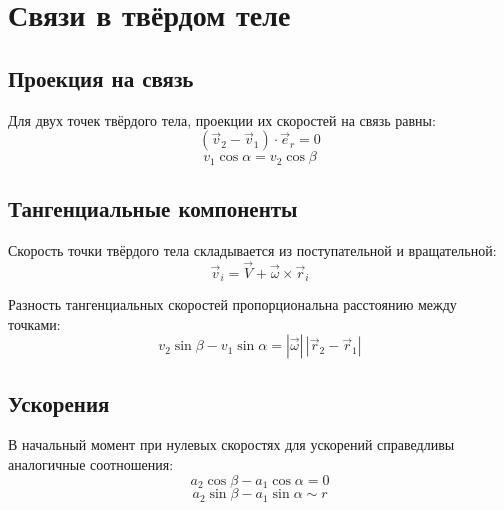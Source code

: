 \documentclass[12pt]{article}
\begin{document}
\section*{Связи в твёрдом теле}

\subsection*{Проекция на связь}
Для двух точек твёрдого тела, проекции их скоростей на связь равны:
\[(\vec v_2 - \vec v_1)\cdot\vec e_r = 0\]
\[v_1\cos\alpha = v_2\cos\beta\]

\subsection*{Тангенциальные компоненты}
Скорость точки твёрдого тела складывается из поступательной и вращательной:
\[\vec v_i = \vec V + \vec\omega \times \vec r_i\]

Разность тангенциальных скоростей пропорциональна расстоянию между точками:
\[v_2\sin\beta - v_1\sin\alpha = |\vec\omega|\,|\vec r_2 - \vec r_1|\]

\subsection*{Ускорения}
В начальный момент при нулевых скоростях для ускорений справедливы аналогичные соотношения:
\[a_2\cos\beta - a_1\cos\alpha = 0\]
\[a_2\sin\beta - a_1\sin\alpha \sim r\]
\end{document}
